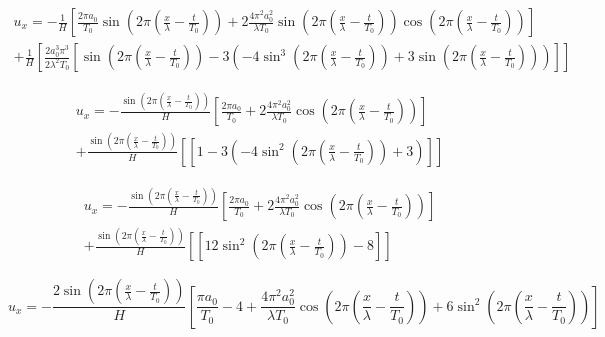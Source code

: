 \documentclass[12pt]{article}
\begin{document}
\begin{multline}
u_x = -\frac{1}{H}\left[\frac{2\pi a_0}{T_0} \sin\left(2 \pi \left(\frac{x}{\lambda} - \frac{t}{T_0}\right)\right) + 2\frac{4\pi^2 a_0^2}{\lambda T_0} \sin\left(2 \pi \left(\frac{x}{\lambda} - \frac{t}{T_0}\right)\right) \cos\left(2 \pi \left(\frac{x}{\lambda} - \frac{t}{T_0}\right)\right) \right] \\ +\frac{1}{H}\left[ \frac{2a_0^3 \pi^3}{2 \lambda^2 T_0} \left[\sin\left(2 \pi \left(\frac{x}{\lambda} - \frac{t}{T_0}\right)\right)  -3 \left(-4\sin^3\left(2 \pi \left(\frac{x}{\lambda} - \frac{t}{T_0}\right)\right) + 3\sin\left(2 \pi \left(\frac{x}{\lambda} - \frac{t}{T_0}\right)\right) \right)\right]\right]
\end{multline}

\begin{multline}
u_x = -\frac{\sin\left(2 \pi \left(\frac{x}{\lambda} - \frac{t}{T_0}\right)\right)}{H}\left[\frac{2\pi a_0}{T_0}  + 2\frac{4\pi^2 a_0^2}{\lambda T_0} \cos\left(2 \pi \left(\frac{x}{\lambda} - \frac{t}{T_0}\right)\right) \right] \\ +\frac{\sin\left(2 \pi \left(\frac{x}{\lambda} - \frac{t}{T_0}\right)\right)}{H} \left[ \left[1 -3 \left(-4\sin^2\left(2 \pi \left(\frac{x}{\lambda} - \frac{t}{T_0}\right)\right) + 3 \right)\right]\right]
\end{multline}

\begin{multline}
u_x = -\frac{\sin\left(2 \pi \left(\frac{x}{\lambda} - \frac{t}{T_0}\right)\right)}{H}\left[\frac{2\pi a_0}{T_0}  + 2\frac{4\pi^2 a_0^2}{\lambda T_0} \cos\left(2 \pi \left(\frac{x}{\lambda} - \frac{t}{T_0}\right)\right) \right] \\ +\frac{\sin\left(2 \pi \left(\frac{x}{\lambda} - \frac{t}{T_0}\right)\right)}{H} \left[ \left[ 12\sin^2\left(2 \pi \left(\frac{x}{\lambda} - \frac{t}{T_0}\right)\right) - 8 \right]\right]
\end{multline}

\[
u_x = -\frac{2\sin\left(2 \pi \left(\frac{x}{\lambda} - \frac{t}{T_0}\right)\right)}{H}\left[\frac{\pi a_0}{T_0} -4 + \frac{4\pi^2 a_0^2}{\lambda T_0} \cos\left(2 \pi \left(\frac{x}{\lambda} - \frac{t}{T_0}\right)\right) + 6\sin^2\left(2 \pi \left(\frac{x}{\lambda} - \frac{t}{T_0}\right)\right) \right]
\]
\end{document}
